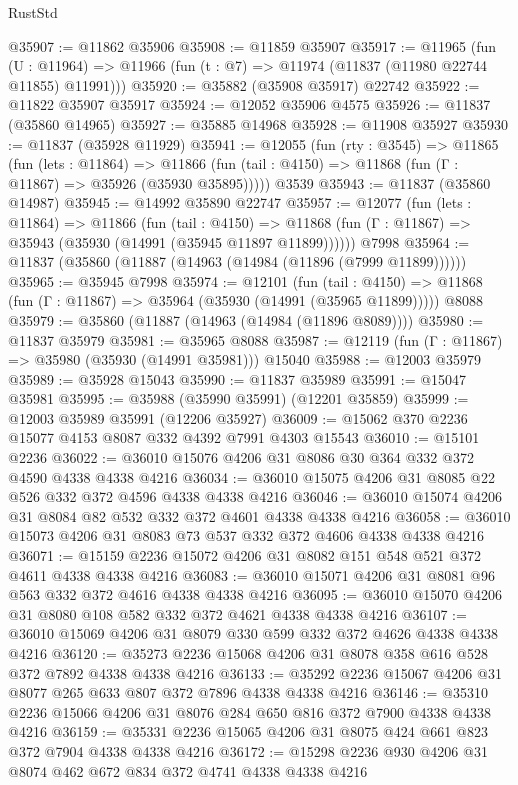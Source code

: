 \begin{lexlean}{RustStd}
\begin{coremodule}
{\begin{coremodule}
{{{{{{{{{{{{{{{{{{{{{{{{{{{{{{{{{{{{{{{{{{{{{{{{{{@35907 := @11862 @35906
@35908 := @11859 @35907
@35917 := @11965
    (fun (U : @11964) => @11966 (fun (t : @7) => @11974 (@11837 (@11980 @22744 @11855) @11991)))
@35920 := @35882 (@35908 @35917) @22742
@35922 := @11822 @35907 @35917
@35924 := @12052 @35906 @4575
@35926 := @11837 (@35860 @14965)
@35927 := @35885 @14968
@35928 := @11908 @35927
@35930 := @11837 (@35928 @11929)
@35941 := @12055
    (fun (rty : @3545) =>
    @11865
      (fun (lets : @11864) =>
      @11866 (fun (tail : @4150) => @11868 (fun (Γ : @11867) => @35926 (@35930 @35895)))))
    @3539
@35943 := @11837 (@35860 @14987)
@35945 := @14992 @35890 @22747
@35957 := @12077
    (fun (lets : @11864) =>
    @11866
      (fun (tail : @4150) =>
      @11868 (fun (Γ : @11867) => @35943 (@35930 (@14991 (@35945 @11897 @11899))))))
    @7998
@35964 := @11837 (@35860 (@11887 (@14963 (@14984 (@11896 (@7999 @11899))))))
@35965 := @35945 @7998
@35974 := @12101
    (fun (tail : @4150) => @11868 (fun (Γ : @11867) => @35964 (@35930 (@14991 (@35965 @11899)))))
    @8088
@35979 := @35860 (@11887 (@14963 (@14984 (@11896 @8089))))
@35980 := @11837 @35979
@35981 := @35965 @8088
@35987 := @12119 (fun (Γ : @11867) => @35980 (@35930 (@14991 @35981))) @15040
@35988 := @12003 @35979
@35989 := @35928 @15043
@35990 := @11837 @35989
@35991 := @15047 @35981
@35995 := @35988 (@35990 @35991) (@12201 @35859)
@35999 := @12003 @35989 @35991 (@12206 @35927)
@36009 := @15062 @370 @2236 @15077 @4153 @8087 @332 @4392 @7991 @4303 @15543
@36010 := @15101 @2236
@36022 := @36010 @15076 @4206 @31 @8086 @30 @364 @332 @372 @4590 @4338 @4338 @4216
@36034 := @36010 @15075 @4206 @31 @8085 @22 @526 @332 @372 @4596 @4338 @4338 @4216
@36046 := @36010 @15074 @4206 @31 @8084 @82 @532 @332 @372 @4601 @4338 @4338 @4216
@36058 := @36010 @15073 @4206 @31 @8083 @73 @537 @332 @372 @4606 @4338 @4338 @4216
@36071 := @15159 @2236 @15072 @4206 @31 @8082 @151 @548 @521 @372 @4611 @4338 @4338 @4216
@36083 := @36010 @15071 @4206 @31 @8081 @96 @563 @332 @372 @4616 @4338 @4338 @4216
@36095 := @36010 @15070 @4206 @31 @8080 @108 @582 @332 @372 @4621 @4338 @4338 @4216
@36107 := @36010 @15069 @4206 @31 @8079 @330 @599 @332 @372 @4626 @4338 @4338 @4216
@36120 := @35273 @2236 @15068 @4206 @31 @8078 @358 @616 @528 @372 @7892 @4338 @4338 @4216
@36133 := @35292 @2236 @15067 @4206 @31 @8077 @265 @633 @807 @372 @7896 @4338 @4338 @4216
@36146 := @35310 @2236 @15066 @4206 @31 @8076 @284 @650 @816 @372 @7900 @4338 @4338 @4216
@36159 := @35331 @2236 @15065 @4206 @31 @8075 @424 @661 @823 @372 @7904 @4338 @4338 @4216
@36172 := @15298 @2236 @930 @4206 @31 @8074 @462 @672 @834 @372 @4741 @4338 @4338 @4216
}}}}}}}}}}}}}}}}}}}}}}}}}}}}}}}}}}}}}}}}}}}}}}}}}}
\end{coremodule}}
\end{coremodule}
\end{lexlean}
